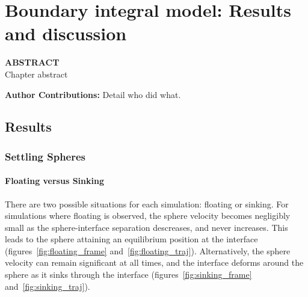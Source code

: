 
\chapter[Boundary integral model: Results and discussion]{Boundary integral model: Results and discussion}
\label{ch:mod_res} %
\textbf{ABSTRACT}\\
\small{Chapter abstract} %
\vfill
\small{\textbf{Author Contributions:} Detail who did what.
\newpage


\section{Results}
\label{sec:res}

\subsection{Settling Spheres}
\label{subsec:sphere_res}

\subsubsection{Floating versus Sinking}
\label{subsubsec:sphere_float}

There are two possible situations for each simulation: floating or sinking. For simulations where floating is observed, the sphere velocity becomes negligibly small as the sphere-interface separation descreases, and never increases. This leads to the sphere attaining an equilibrium position at the interface (figures~\ref{fig:floating_frame} and~\ref{fig:floating_traj}). Alternatively, the sphere velocity can remain significant at all times, and the interface deforms around the sphere as it sinks through the interface (figures~\ref{fig:sinking_frame} and~\ref{fig:sinking_traj}). 

    \begin{figure}
      \centering
      \begin{subfigure}[b]{0.45\textwidth}
        \resizebox{\textwidth}{!}{\Large }
        \caption{}
        \label{fig:floating_frame2}
      \end{subfigure}
      ~
      \begin{subfigure}[b]{0.45\textwidth}
        \resizebox{\textwidth}{!}{\Large }
        \caption{}
        \label{fig:floating_frame3}
      \end{subfigure}
      

\end{figure}}
